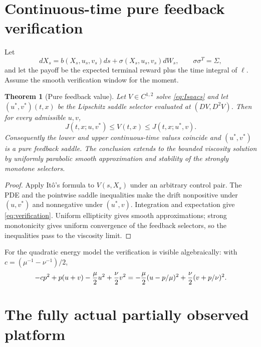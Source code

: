 \documentclass[11pt,reqno]{amsart}
\newtheorem{theorem}{Theorem}[section]
\theoremstyle{definition}
\theoremstyle{remark}
\begin{document}
\section{Continuous-time pure feedback verification}

Let
\begin{equation}\label{eq:controlled-SDE}
 dX_s=b(X_s,u_s,v_s)ds+\sigma(X_s,u_s,v_s)dW_s,
 \qquad \sigma\sigma^T=\Sigma,
\end{equation}
and let the payoff be the expected terminal reward plus the time integral of
$\ell$.  Assume the smooth verification window for the moment.

\begin{theorem}[Pure feedback value]\label{thm:feedback}
Let $V\in C^{1,2}$ solve \eqref{eq:Isaacs} and let
$(u^*,v^*)(t,x)$ be the Lipschitz saddle selector evaluated at
$(DV,D^2V)$.  Then for every admissible $u,v$,
\begin{equation}\label{eq:verification}
 J(t,x;u,v^*)\le V(t,x)\le J(t,x;u^*,v).
\end{equation}
Consequently the lower and upper continuous-time values coincide and
$(u^*,v^*)$ is a pure feedback saddle.  The conclusion extends to the bounded
viscosity solution by uniformly parabolic smooth approximation and stability
of the strongly monotone selectors.
\end{theorem}

\begin{proof}
Apply It\^o's formula to $V(s,X_s)$ under an arbitrary control pair.  The PDE
and the pointwise saddle inequalities make the drift nonpositive under
$(u,v^*)$ and nonnegative under $(u^*,v)$.  Integration and expectation give
\eqref{eq:verification}.  Uniform ellipticity gives smooth approximations;
strong monotonicity gives uniform convergence of the feedback selectors, so
the inequalities pass to the viscosity limit.
\end{proof}

For the quadratic energy model the verification is visible algebraically:
with $c=(\mu^{-1}-\nu^{-1})/2$,
\begin{equation}\label{eq:squares}
 -cp^2+p(u+v)-{\mu\over2}u^2+{\nu\over2}v^2
 =-{\mu\over2}(u-p/\mu)^2
 +{\nu\over2}(v+p/\nu)^2.
\end{equation}

\section{The fully actual partially observed platform}
\end{document}
